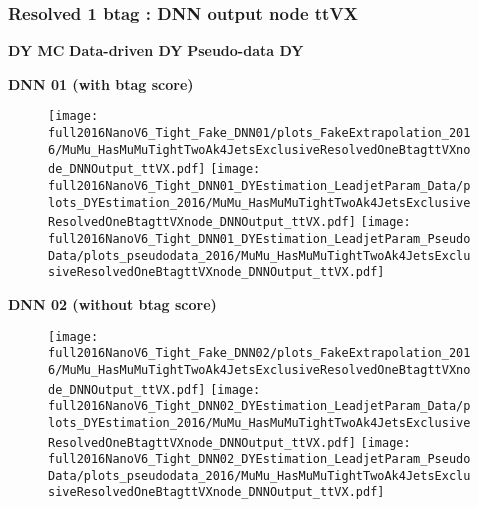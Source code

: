 \documentclass[9pt]{beamer}
\begin{document}
\begin{frame}
	\frametitle{Resolved 1 btag : DNN output node ttVX}
    \hspace{2cm} \textbf{DY MC} \hspace{1.9cm} \textbf{Data-driven DY} \hspace{1cm} \textbf{Pseudo-data DY}
    \begin{center}
        \textbf{DNN 01 (with btag score)}
    \end{center}
	\begin{figure}
		\texttt{[image: full2016NanoV6\_Tight\_Fake\_DNN01/plots\_FakeExtrapolation\_2016/MuMu\_HasMuMuTightTwoAk4JetsExclusiveResolvedOneBtagttVXnode\_DNNOutput\_ttVX.pdf]}
		\texttt{[image: full2016NanoV6\_Tight\_DNN01\_DYEstimation\_LeadjetParam\_Data/plots\_DYEstimation\_2016/MuMu\_HasMuMuTightTwoAk4JetsExclusiveResolvedOneBtagttVXnode\_DNNOutput\_ttVX.pdf]}
		\texttt{[image: full2016NanoV6\_Tight\_DNN01\_DYEstimation\_LeadjetParam\_PseudoData/plots\_pseudodata\_2016/MuMu\_HasMuMuTightTwoAk4JetsExclusiveResolvedOneBtagttVXnode\_DNNOutput\_ttVX.pdf]}
	\end{figure}
    \begin{center}
        \textbf{DNN 02 (without btag score)}
    \end{center}
	\begin{figure}
		\texttt{[image: full2016NanoV6\_Tight\_Fake\_DNN02/plots\_FakeExtrapolation\_2016/MuMu\_HasMuMuTightTwoAk4JetsExclusiveResolvedOneBtagttVXnode\_DNNOutput\_ttVX.pdf]}
		\texttt{[image: full2016NanoV6\_Tight\_DNN02\_DYEstimation\_LeadjetParam\_Data/plots\_DYEstimation\_2016/MuMu\_HasMuMuTightTwoAk4JetsExclusiveResolvedOneBtagttVXnode\_DNNOutput\_ttVX.pdf]}
		\texttt{[image: full2016NanoV6\_Tight\_DNN02\_DYEstimation\_LeadjetParam\_PseudoData/plots\_pseudodata\_2016/MuMu\_HasMuMuTightTwoAk4JetsExclusiveResolvedOneBtagttVXnode\_DNNOutput\_ttVX.pdf]}
	\end{figure}
\end{frame}
\end{document}
